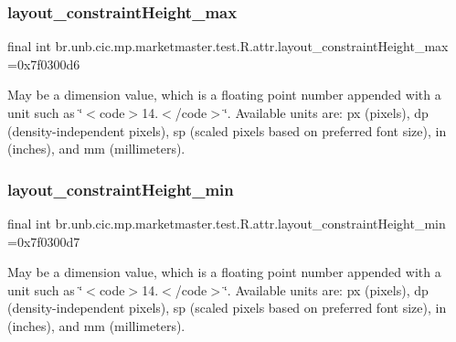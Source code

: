 \subsubsection{\texorpdfstring{layout\+\_\+constraint\+Height\+\_\+max}{layout\_constraintHeight\_max}}
{\footnotesize\ttfamily final int br.\+unb.\+cic.\+mp.\+marketmaster.\+test.\+R.\+attr.\+layout\+\_\+constraint\+Height\+\_\+max =0x7f0300d6\hspace{0.3cm}{\ttfamily [static]}}

May be a dimension value, which is a floating point number appended with a unit such as \char`\"{}$<$code$>$14.\+5sp$<$/code$>$\char`\"{}. Available units are\+: px (pixels), dp (density-\/independent pixels), sp (scaled pixels based on preferred font size), in (inches), and mm (millimeters). \mbox{\label{classbr_1_1unb_1_1cic_1_1mp_1_1marketmaster_1_1test_1_1R_1_1attr_aadc39f1be0602c45b2cab26cff2aa721}} 
\subsubsection{\texorpdfstring{layout\+\_\+constraint\+Height\+\_\+min}{layout\_constraintHeight\_min}}
{\footnotesize\ttfamily final int br.\+unb.\+cic.\+mp.\+marketmaster.\+test.\+R.\+attr.\+layout\+\_\+constraint\+Height\+\_\+min =0x7f0300d7\hspace{0.3cm}{\ttfamily [static]}}

May be a dimension value, which is a floating point number appended with a unit such as \char`\"{}$<$code$>$14.\+5sp$<$/code$>$\char`\"{}. Available units are\+: px (pixels), dp (density-\/independent pixels), sp (scaled pixels based on preferred font size), in (inches), and mm (millimeters). \mbox{\label{classbr_1_1unb_1_1cic_1_1mp_1_1marketmaster_1_1test_1_1R_1_1attr_aaf7b6e997aa41a33d033c75c395ff630}} 

